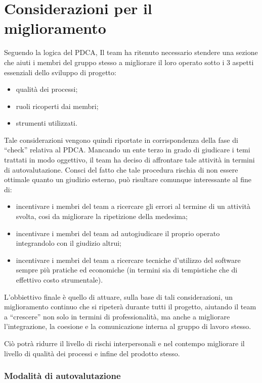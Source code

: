 \appendix
\section{Considerazioni per il miglioramento}

Seguendo la logica del PDCA, Il team ha ritenuto necessario stendere una sezione che aiuti i membri del gruppo stesso a migliorare il loro operato sotto i 3 aspetti essenziali dello sviluppo di progetto:

\begin{itemize}
	\item qualità dei processi;
	\item ruoli ricoperti dai membri;
	\item strumenti utilizzati.
\end{itemize}

Tale considerazioni vengono quindi riportate in corrispondenza della fase di ``check'' relativa al PDCA. Mancando un ente terzo in grado di giudicare i temi trattati in modo oggettivo, il team ha deciso di affrontare tale attività in termini di autovalutazione. Consci del fatto che tale procedura rischia di non essere ottimale quanto un giudizio esterno, può risultare comunque interessante al fine di:

\begin{itemize}
	\item incentivare i membri del team a ricercare gli errori al termine di un attività svolta, cosi da migliorare la ripetizione della medesima;
	\item incentivare i membri del team ad autogiudicare il proprio operato integrandolo con il giudizio altrui;
	\item incentivare i membri del team a ricercare tecniche d'utilizzo del software sempre più pratiche ed economiche (in termini sia di tempistiche che di effettivo costo strumentale).
\end{itemize}

L'obbiettivo finale è quello di attuare, sulla base di tali considerazioni, un miglioramento continuo che si ripeterà durante tutti il progetto, aiutando il team a ``crescere'' non solo in termini di professionalità, ma anche a migliorare l'integrazione, la coesione e la comunicazione interna al gruppo di lavoro stesso. 

Ciò potrà ridurre il livello di rischi interpersonali e nel contempo migliorare il livello di qualità dei processi e infine del prodotto stesso.

\subsubsection{Modalità di autovalutazione}

